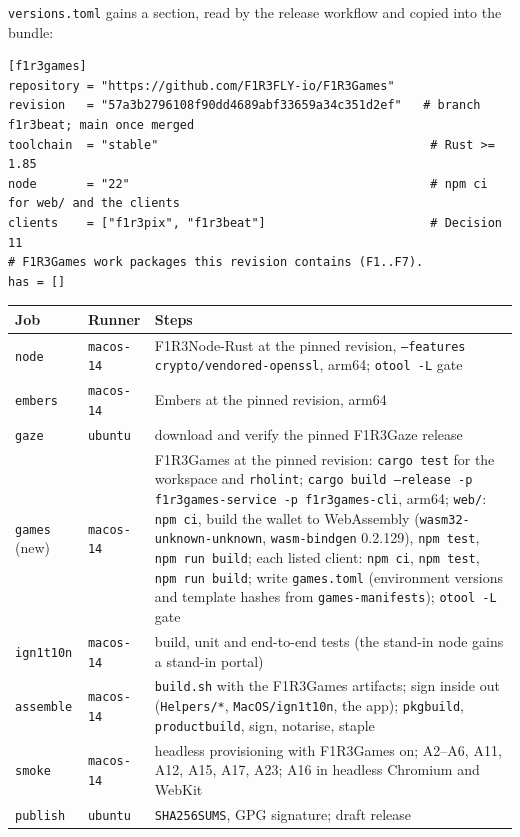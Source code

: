 \documentclass[11pt]{article}
\theoremstyle{definition}
\theoremstyle{remark}
\newcommand{\code}[1]{\texttt{#1}}
\newcommand{\Gz}{F1R3Gaze}
\newcommand{\Nd}{F1R3Node-Rust}
\newcommand{\Gm}{F1R3Games}
\newcommand{\Em}{Embers}
\begin{document}
\code{versions.toml} gains a section, read by the release workflow and copied into
the bundle:

\begin{lstlisting}[language=Conf]
[f1r3games]
repository = "https://github.com/F1R3FLY-io/F1R3Games"
revision   = "57a3b2796108f90dd4689abf33659a34c351d2ef"   # branch f1r3beat; main once merged
toolchain  = "stable"                                      # Rust >= 1.85
node       = "22"                                          # npm ci for web/ and the clients
clients    = ["f1r3pix", "f1r3beat"]                       # Decision 11
# F1R3Games work packages this revision contains (F1..F7).
has = []
\end{lstlisting}

\begin{center}\small
\renewcommand{\arraystretch}{1.15}
\begin{tabularx}{\linewidth}{@{}p{2.0cm}p{1.9cm}X@{}}
\toprule
Job & Runner & Steps\\
\midrule
\code{node} & \code{macos-14} & \Nd{} at the pinned revision, \code{--features crypto/vendored-openssl}, arm64; \code{otool -L} gate\\
\code{embers} & \code{macos-14} & \Em{} at the pinned revision, arm64\\
\code{gaze} & \code{ubuntu} & download and verify the pinned \Gz{} release\\
\code{games} (new) & \code{macos-14} & \Gm{} at the pinned revision: \code{cargo test} for the workspace and \code{rholint}; \code{cargo build --release -p f1r3games-service -p f1r3games-cli}, arm64; \code{web/}: \code{npm ci}, build the wallet to WebAssembly (\code{wasm32-unknown-unknown}, \code{wasm-bindgen} 0.2.129), \code{npm test}, \code{npm run build}; each listed client: \code{npm ci}, \code{npm test}, \code{npm run build}; write \code{games.toml} (environment versions and template hashes from \code{games-manifests}); \code{otool -L} gate\\
\code{ign1t10n} & \code{macos-14} & build, unit and end-to-end tests (the stand-in node gains a stand-in portal)\\
\code{assemble} & \code{macos-14} & \code{build.sh} with the \Gm{} artifacts; sign inside out (\code{Helpers/*}, \code{MacOS/ign1t10n}, the app); \code{pkgbuild}, \code{productbuild}, sign, notarise, staple\\
\code{smoke} & \code{macos-14} & headless provisioning with \Gm{} on; A2--A6, A11, A12, A15, A17, A23; A16 in headless Chromium and WebKit\\
\code{publish} & \code{ubuntu} & \code{SHA256SUMS}, GPG signature; draft release\\
\bottomrule
\end{tabularx}
\end{center}
\end{document}
